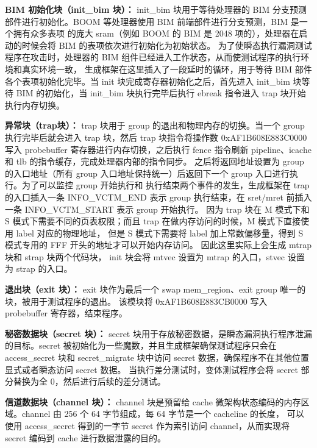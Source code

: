 \textbf{BIM 初始化块（init\_bim 块）：}
init\_bim 块用于等待处理器的 BIM 分支预测部件进行初始化。BOOM 等处理器使用 BIM 前端部件进行分支预测，BIM 是一个拥有众多表项
的庞大 sram（例如 BOOM 的 BIM 是 2048 项的），处理器在启动的时候会将 BIM 的表项依次进行初始化为初始状态。
为了使瞬态执行漏洞测试程序在攻击时，处理器的 BIM 组件已经进入工作状态，从而使测试程序的执行环境和真实环境一致，
生成框架在这里插入了一段延时的循环，用于等待 BIM 部件各个表项初始化完毕。当 init 块完成寄存器初始化之后，首先进入
init\_bim 块等待 BIM 的初始化，当 init\_bim 块执行完毕后执行 ebreak 指令进入 trap 块开始执行内存切换。\par

\textbf{异常块（trap块）：}
trap 块用于 group 的退出和物理内存的切换。当一个 group 执行完毕后就会进入 trap 块，然后 trap 块指令将操作数 0xAF1B608E883C0000
写入 probebuffer 寄存器进行内存切换，之后执行 fence 指令刷新 pipeline、icache 和 tlb 的指令缓存，完成处理器内部的指令同步。
之后将返回地址设置为 group 的入口地址（所有 group 入口地址保持统一）后返回下一个 group 入口进行执行。为了可以监控 group 开始执行和
执行结束两个事件的发生，生成框架在 trap 的入口插入一条 INFO\_VCTM\_END 表示 group 执行结束，在 sret/mret 前插入一条 INFO\_VCTM\_START 表示 group 开始执行。
因为 trap 块在 M 模式下和 S 模式下需要不同的页表权限；而且 trap 在做内存访问的时候，M 模式下直接使用 label 对应的物理地址，
但是 S 模式下需要将 label 加上常数偏移量，得到 S 模式专用的 FFF 开头的地址才可以开始内存访问。
因此这里实际上会生成 mtrap 块和 strap 块两个代码块，
init 块会将 mtvec 设置为 mtrap 的入口，stvec 设置为 strap 的入口。\par

\textbf{退出块（exit 块）：}
exit 块作为最后一个 swap mem\_region、exit group 唯一的块，被用于测试程序的退出。
该模块将 0xAF1B608E883CB0000 写入 probebuffer 寄存器，结束程序。\par

\textbf{秘密数据块（secret 块）：}
secret 块用于存放秘密数据，是瞬态漏洞执行程序泄漏的目标。secret 被初始化为一些魔数，并且生成框架确保测试程序只会在
 access\_secret 块和 secret\_migrate 块中访问 secret 数据，确保程序不在其他位置显式或者瞬态访问 secret 数据。
当执行差分测试时，变体测试程序会将 secret 部分替换为全 0，然后进行后续的差分测试。\par

\textbf{信道数据块（channel 块）：}
channel 块是预留给 cache 微架构状态编码的内存区域。channel 由 256 个 64 字节组成，每 64 字节是一个 cacheline 的长度，
可以使用 access\_secret 得到的一字节 secret 作为索引访问 channel，从而实现将 secret 编码到 cache 进行数据泄露的目的。\par

